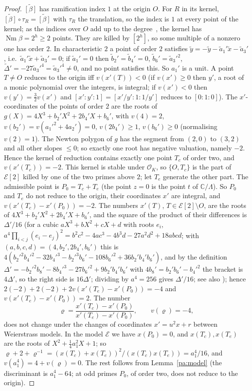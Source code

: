 \documentclass[10pt]{amsart}
\theoremstyle{definition}
\theoremstyle{remark}
\newcommand{\C}{\mathbb C}
\providecommand{\auNm}{\operatorname{Nm}}
\providecommand{\auO}{\mathcal O}
\begin{document}
\begin{proof}
$\widetilde{[\beta]}$ has ramification index $1$ at the origin $O$. For $R$ in its kernel,
$\widetilde{[\beta]}\circ\tau_R=\widetilde{[\beta]}$ with $\tau_R$ the translation, so the index is
$1$ at every point of the kernel; as the indices over $O$ add up to the degree~\cite[Chapter~II, Proposition~2.6(a)]{SilvermanAEC},
the kernel has $\auNm\beta=2^h\ge2$ points. They are killed by $[2^h]$, so some multiple of a nonzero
one has order $2$. In characteristic $2$ a point
of order $2$ satisfies $\tilde y=-\tilde y-\tilde a_1'\tilde x-\tilde a_3'$, i.e.\ $\tilde a_1'\tilde
x+\tilde a_3'=0$; if $\tilde a_1'=0$ then $\tilde b_2'=\tilde b_4'=0$, $\tilde b_6'=\tilde a_3'^2$,
$\tilde\Delta'=-27\tilde a_3'^4=\tilde a_3'^4\ne0$, and no point satisfies this. So $a_1'$ is a unit. A
point $T\ne O$ reduces to the origin iff $v(x'(T))<0$ (if $v(x')\ge0$ then $y'$, a root of a monic
polynomial over the integers, is integral; if $v(x')<0$ then $v(y')=\tfrac32v(x')$ and
$[x':y':1]=[x'/y':1:1/y']$ reduces to $[0:1:0]$). The $x'$-coordinates of the points of order $2$ are the
roots of $g(X)=4X^3+b_2'X^2+2b_4'X+b_6'$, with $v(4)=2$, $v(b_2')=v(a_1'^2+4a_2')=0$, $v(2b_4')\ge1$,
$v(b_6')\ge0$ (normalising $v(2)=1$). The Newton polygon of $g$ has the segment from $(2,0)$ to $(3,2)$ and
all other slopes $\le0$; so exactly one root has negative valuation, namely $-2$. Hence the kernel of reduction
contains exactly one point $T_c$ of order two, and $v(x'(T_c))=-2$. This kernel is stable under $\auO_K$, so
$\{O,T_c\}$ is the part of $\mathcal E[2]$ killed by one of the two primes above $2$; let $T_e$
generate the other part. The admissible point is $P_0=T_c+T_e$ (the point $z=0$ is the point $t$
of $\C/\Lambda$). So $P_0$ and $T_e$ do not reduce to the origin, their coordinates $x'$ are
integral, and $v(x'(T_c)-x'(P_0))=-2$. The numbers $x'(T)$, $T\in\mathcal E[2]\setminus O$, are the
roots of $4X^3+b_2'X^2+2b_4'X+b_6'$, and the square of the product of their differences is
$\Delta'/16$ (for a cubic $aX^3+bX^2+cX+d$ with roots $e_i$, $a^4\prod_{i<j}(e_i-e_j)^2=b^2c^2-4ac^3-4b^3d
-27a^2d^2+18abcd$; with $(a,b,c,d)=(4,b_2',2b_4',b_6')$ this is $4(b_2'^2b_4'^2-32b_4'^3-b_2'^3b_6'-108b_6'^2
+36b_2'b_4'b_6')$, and by the definition $\Delta'=-b_2'^2b_8'-8b_4'^3-27b_6'^2+9b_2'b_4'b_6'$ with
$4b_8'=b_2'b_6'-b_4'^2$ the bracket is $4\Delta'$, so the right side is $16\Delta'$; dividing by $a^4=256$ gives $\Delta'/16$; see also
\cite[Chapter~III, \S1]{SilvermanAEC}); hence $2(-2)+2(-2)+2v(x'(T_e)-x'(P_0))=-4$ and
$v(x'(T_e)-x'(P_0))=2$. The number
\[
\varrho=\frac{x'(T_c)-x'(P_0)}{x'(T_e)-x'(P_0)},\qquad v(\varrho)=-4,
\]
does not change under the changes of coordinates $x'=u^2x+r$ between Weierstrass models. In the
model $\mathcal E$ we have $x(P_0)=0$, and $x(T_c),x(T_e)$ are the roots of $X^2+\tfrac14a_1^2X+1$;
so $\varrho+2+\varrho^{-1}=(x(T_c)+x(T_e))^2/(x(T_c)x(T_e))=a_1^4/16$, and $v(a_1^4)=4+v(\varrho)=0$.
The rest follows from Lemma~\ref{pa:model} (the discriminant is $a_1^4-64$; at odd primes $P_0$,
of order two, does not reduce to the origin).
\end{proof}
\end{document}
